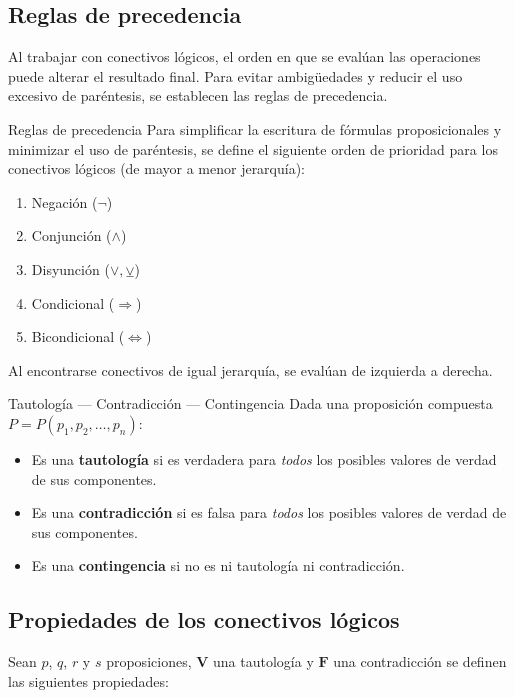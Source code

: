 \subsection*{Reglas de precedencia}

Al trabajar con conectivos lógicos, el orden en que se evalúan las operaciones puede alterar el resultado final. Para evitar ambigüedades y reducir el uso excesivo de paréntesis, se establecen las reglas de precedencia.

\begin{dfn}{Reglas de precedencia}
    Para simplificar la escritura de fórmulas proposicionales y minimizar el uso de paréntesis, se define el siguiente orden de prioridad para los conectivos lógicos (de mayor a menor jerarquía):
    \begin{enumerate}
        \item Negación ($\lnot$)
        \item Conjunción ($\land$)
        \item Disyunción ($\vee, \veebar$)
        \item Condicional ($\Rightarrow$)
        \item Bicondicional ($\Leftrightarrow$)
    \end{enumerate}
    Al encontrarse conectivos de igual jerarquía, se evalúan de izquierda a derecha.
\end{dfn}

\begin{dfn}{Tautología --- Contradicción --- Contingencia}
    Dada una proposición compuesta $P = P(p_1, p_2, \dots, p_n)$:
    \begin{itemize}
        \item Es una \textbf{tautología} si es verdadera para \emph{todos} los posibles valores de verdad de sus componentes.
        \item Es una \textbf{contradicción} si es falsa para \emph{todos} los posibles valores de verdad de sus componentes.
        \item Es una \textbf{contingencia} si no es ni tautología ni contradicción.
    \end{itemize}
\end{dfn}

\newpage
\subsection{Propiedades de los conectivos lógicos}
Sean $p$, $q$, $r$ y $s$ proposiciones, $\textbf{V}$ una tautología y $\textbf{F}$ una contradicción se definen las siguientes propiedades:

